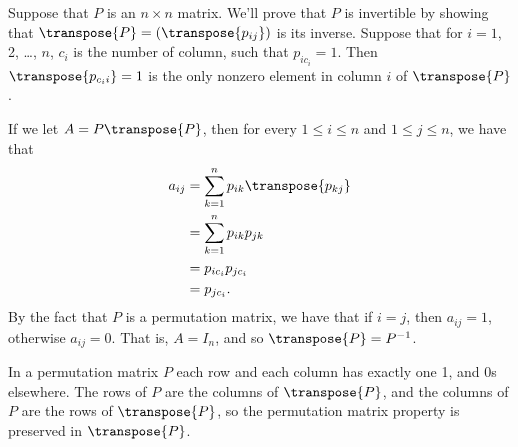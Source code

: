 Suppose that $P$ is an $n\times n$ matrix.
We'll prove that $P$ is invertible by showing that $\transpose{P}=(\transpose{p_{ij}})$ is its inverse.
Suppose that for $i=1$, 2, \dots, $n$, $c_i$ is the number of column, such that $p_{ic_i}=1$.
Then $\transpose{p_{c_ii}}=1$ is the only nonzero element in column $i$ of $\transpose{P}$.

If we let $A=P\transpose{P}$, then for every $1\le i\le n$ and $1\le j\le n$, we have that
\begin{align*}
    a_{ij} &= \sum_{k=1}^np_{ik}\transpose{p_{kj}} \\
    &= \sum_{k=1}^np_{ik}p_{jk} \\
    &= p_{ic_i}p_{jc_i} \\
    &= p_{jc_i}.
\end{align*}
By the fact that $P$ is a permutation matrix, we have that if $i=j$, then $a_{ij}=1$, otherwise $a_{ij}=0$.
That is, $A=I_n$, and so $\transpose{P}=P^{-1}$.

In a permutation matrix $P$ each row and each column has exactly one 1, and 0s elsewhere.
The rows of $P$ are the columns of $\transpose{P}$, and the columns of $P$ are the rows of $\transpose{P}$, so the permutation matrix property is preserved in $\transpose{P}$.
